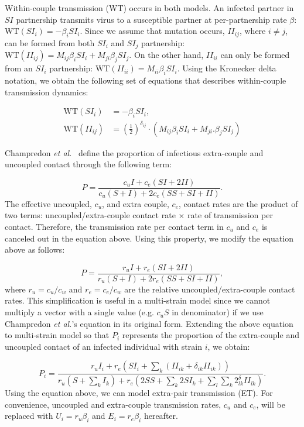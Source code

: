 \documentclass[10pt,letterpaper]{article}
\newcommand{\khalf}{\left(\frac{1}{2}\right)^{\delta_{ij}}}  %
\newcommand{\etal}{\textit{et al.}}
\newcommand{\WT}{\textrm{WT}}
\begin{document}
Within-couple transmission (WT) occurs in both models. An infected partner in $SI$ partnership transmits virus to a susceptible partner at per-partnership rate $\beta$: $\WT(SI_i) = - \beta_i SI_i$. Since we assume that mutation occurs, $II_{ij}$, where $i \neq j$, can be formed from both $SI_i$ and $SI_j$ partnership: $\WT(II_{ij}) = M_{ij} \beta_i SI_i + M_{ji} \beta_j SI_j$. On the other hand, $II_{ii}$ can only be formed from an $SI_i$ partnership: $\WT(II_{ii}) = M_{ii} \beta_i SI_i$. Using the Kronecker delta notation, we obtain the following set of equations that describes within-couple transmission dynamics:

\begin{equation}
\begin{aligned}
\WT(SI_i) &= - \beta_i SI_i,\\
\WT(II_{ij}) &=  \khalf \cdot (M_{ij} \beta_i SI_i + M_{ji}. \beta_j SI_j)
\end{aligned}
\end{equation}

Champredon \etal\ \cite{champredon_hiv_2013} define the proportion of infectious extra-couple and uncoupled contact through the following term:

\begin{equation}
P = \frac{c_u I + c_e (SI + 2 II)}{c_u (S + I) + 2 c_e(SS + SI + II)}.
\end{equation}
The effective uncoupled, $c_u$, and extra couple, $c_e$, contact rates are the product of two terms: uncoupled/extra-couple contact rate $\times$ rate of transmission per contact. Therefore, the transmission rate per contact term in $c_u$ and $c_e$ is canceled out in the equation above. Using this property, we modify the equation above as follows:

\begin{equation}
P = \frac{r_u I + r_e (SI + 2 II)}{r_u (S + I) + 2 r_e(SS + SI + II)},
\end{equation}
where $r_u = c_u/c_w$ and $r_e = c_e/c_w$ are the relative uncoupled/extra-couple contact rates. This simplification is useful in a multi-strain model since we cannot multiply a vector with a single value (e.g. $c_u S$ in denominator) if we use Champredon \etal's equation in its original form. Extending the above equation to multi-strain model so that $P_i$ represents the proportion of the extra-couple and uncoupled contact of an infected individual with strain $i$, we obtain:

\begin{equation}
P_i = \frac{r_u I_i + r_e (SI_i + \sum_k (II_{ik} + \delta_{ik} II_{ik}))}{r_u (S + \sum_k I_k) + r_e(2 SS + \sum_k 2 SI_k + \sum_l \sum_k 2^\delta_{lk} II_{lk} )}.
\end{equation}
Using the equation above, we can model extra-pair transmission (ET). For convenience, uncoupled and extra-couple transmission rates, $c_u$ and $c_e$, will be replaced with $U_i = r_u \beta_i$ and $E_i = r_e \beta_i$ hereafter.
\end{document}
